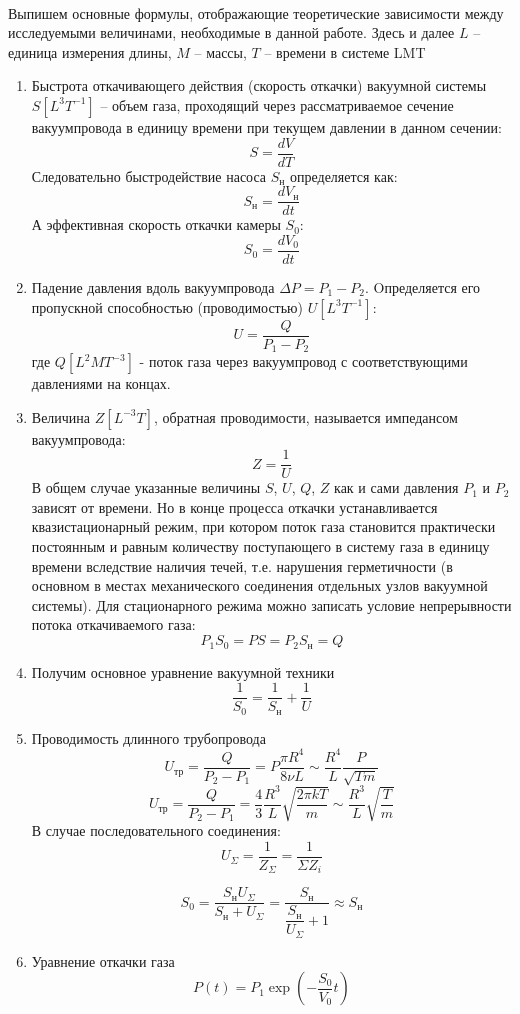 \documentclass[a4paper,12pt]{article}
\begin{document}
\paragraph{}
Выпишем основные формулы, отображающие теоретические зависимости между исследуемыми величинами, необходимые в данной работе. Здесь и далее $L$ -- единица измерения длины, $M$ -- массы, $T$ --  времени в системе LMT
\begin{enumerate}
\itemsep0em
\item Быстрота откачивающего действия (скорость откачки) вакуумной системы $S [L^3T^{-1}]$ -- объем газа, проходящий через рассматриваемое сечение вакуумпровода в единицу времени при текущем давлении в данном сечении:
\[S = \dfrac{dV}{dT}\]
Следовательно быстродействие насоса $S_{\text{н}}$ определяется как:
\begin{equation}
 S_{ \text{н} } = \dfrac{dV_{ \text{н} }}{dt}
\end{equation}
А эффективная скорость откачки камеры $S_0$:
\begin{equation}
S_0 = \dfrac{ dV_0 }{ dt } 
\end{equation}
\item Падение давления вдоль вакуумпровода $ \Delta P = P_1 - P_2 $. Oпределяется его пропускной способностью (проводимостью) $ U [L^3 T^{-1} ] $:
\[ U = \dfrac{Q}{P_1 - P_2} \]
где $Q [L^2 M T^{-3}]$ - поток газа через вакуумпровод с соответствующими давлениями на концах.
\item Величина $Z [L^{-3}T]$, обратная проводимости, называется импедансом вакуумпровода:
\[Z=\dfrac{1}{U}\]
В общем случае указанные величины $S$, $U$, $Q$, $Z$ как и сами давления $P_1$ и $P_2$ зависят от времени. Но в конце процесса откачки устанавливается квазистационарный режим, при котором поток газа становится практически постоянным и равным количеству поступающего в систему газа в единицу времени вследствие наличия течей, т.е. нарушения герметичности (в основном в местах механического соединения отдельных узлов вакуумной системы). Для стационарного режима можно записать условие непрерывности потока откачиваемого газа:
\[P_1 S_0 = PS = P_2 S_{\text{н}} = Q \]
\item Получим основное уравнение вакуумной техники
\begin{equation}
\dfrac{1}{S_0} = \dfrac{1}{S_{ \text{н} }} + \dfrac{1}{U}
\end{equation}
\item Проводимость длинного трубопровода
\[U_{\text{тр}} = \dfrac{Q}{P_2 - P_1} = P\dfrac{\pi R^4}{8 \nu L} \sim \dfrac{R^4}{L} \dfrac{P}{\sqrt{Tm}}\]
\[U_{\text{тр}} = \dfrac{Q}{P_2 - P_1} = \dfrac{4}{3} \dfrac{R^3}{L}\sqrt{\dfrac{2 \pi k T}{m}} \sim \dfrac{R^3}{L} \sqrt{\dfrac{T}{m}} \]
В случае последовательного соединения:
\[U_{\Sigma} = \dfrac{1}{Z_{\Sigma}} = \dfrac{1}{\Sigma Z_i}\]

\[S_0 = \dfrac{S_{\text{н}}U_{\Sigma}}{S_{\text{н}} + U_{\Sigma}} = \dfrac{S_{\text{н}}}{\dfrac{S_{\text{н}}}{U_{\Sigma}} + 1} \approx S_{\text{н}} \]	
\item Уравнение откачки газа
\begin{equation}
P(t) = P_1 \exp \left( -\dfrac{S_0}{V_0} t \right)
\end{equation}
\end{enumerate}
\end{document}

